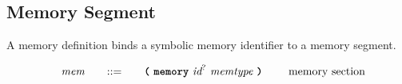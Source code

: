\subsection{Memory Segment}

A memory definition binds a symbolic memory identifier to a memory segment.

\begin{alignat*}{9}
    && \textit{mem}    &&\quad ::= &\quad && \textbf{\texttt{(}}\ \textbf{\texttt{memory}}\ \textit{id}^?\ \textit{memtype}\ \textbf{\texttt{)}}\ \quad && \textrm{memory section} \\[1mm]
\end{alignat*}